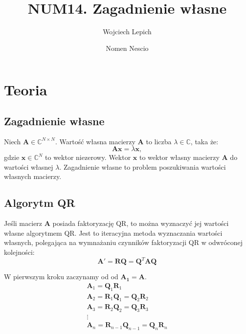 \documentclass[a4paper,11pt]{article}
\author{Wojciech Lepich \and Nomen Nescio}
\title{NUM14. Zagadnienie własne}
\begin{document}
\maketitle

\section{Teoria}

\subsection{Zagadnienie własne}

Niech \(\mathbf{A} \in \mathbb{C}^{N\times N} \). Wartość własna macierzy
\(\mathbf{A}\) to liczba \(\lambda \in \mathbb{C}\), taka że:
\begin{equation}
    \mathbf{A}\mathbf{x} = \lambda\mathbf{x},
\end{equation}
gdzie \(\mathbf{x}\in \mathbb{C}^N\) to wektor niezerowy. Wektor \(\mathbf{x}\) 
to wektor własny macierzy \(\mathbf{A}\) do wartości własnej \(\lambda \).
Zagadnienie własne to problem poszukiwania wartości własnych macierzy.

\subsection{Algorytm QR}

Jeśli macierz \(\mathbf{A}\) posiada faktoryzację QR, to można wyznaczyć jej
wartości własne algorytmem QR.\@
Jest to iteracyjna metoda wyznaczania wartości własnych, polegająca na
wymnażaniu czynników faktoryzacji QR w odwróconej kolejności:
\begin{equation}
    \mathbf{A}' = \mathbf{R}\mathbf{Q} = \mathbf{Q}^T \mathbf{A}\mathbf{Q}
\end{equation}


W pierwszym kroku zaczynamy od od \(\mathbf{A_1 = A}\).
\begin{equation}
    \begin{aligned}
        \mathbf{A}_1 = \mathbf{Q}_1\mathbf{R}_1 \\
        \mathbf{A}_2 = \mathbf{R}_1\mathbf{Q}_1 = \mathbf{Q}_2\mathbf{R}_2 \\
        \mathbf{A}_3 = \mathbf{R}_2\mathbf{Q}_2 = \mathbf{Q}_3\mathbf{R}_3 \\
        \vdots \\
        \mathbf{A}_n = \mathbf{R}_{n-1}\mathbf{Q}_{n-1} = \mathbf{Q}_n\mathbf{R}_n
    \end{aligned}
\end{equation}
\end{document}
